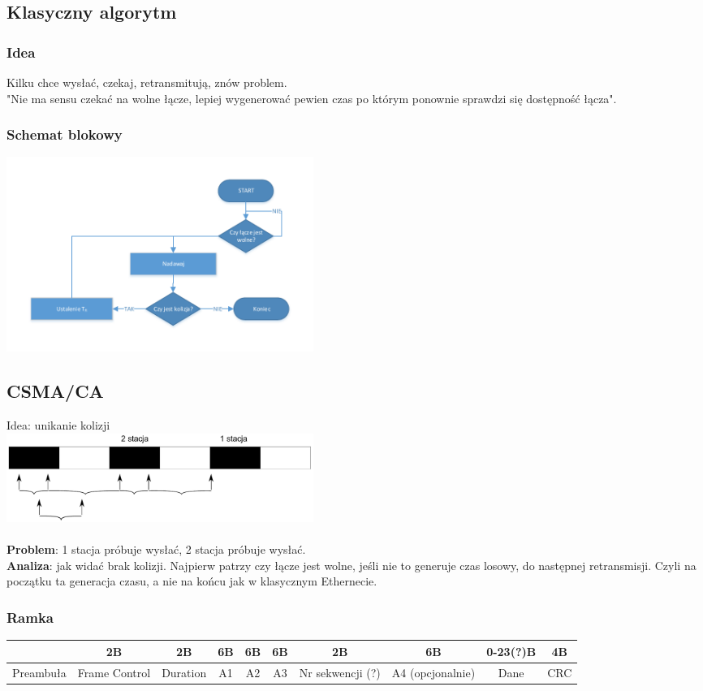 		\subsection{Klasyczny algorytm}
			\subsubsection{Idea}
				Kilku chce wysłać, czekaj, retransmitują, znów problem.\\
				"Nie ma sensu czekać na wolne łącze, lepiej wygenerować pewien czas po którym ponownie sprawdzi się dostępność łącza".
			\subsubsection{Schemat blokowy}
				\includegraphics[width=10cm]{./images/image21.pdf}
		\subsection{CSMA/CA}
			Idea: unikanie kolizji\\
			\includegraphics[width=10cm]{./images/image22.pdf}\\\\
			\textbf{Problem}: 1 stacja próbuje wysłać, 2 stacja próbuje wysłać.\\
			\textbf{Analiza}: jak widać brak kolizji. Najpierw patrzy czy łącze jest wolne, jeśli nie to generuje czas losowy, do następnej retransmisji. Czyli na początku ta generacja czasu, a nie na końcu jak w klasycznym Ethernecie.
		\subsubsection{Ramka}
			\begin{tabular}{|c|c|c|c|c|c|c|c|c|c|}
				\hline  & 2B & 2B & 6B & 6B & 6B & 2B & 6B & 0-23(?)B & 4B \\ 
				\hline Preambuła & Frame Control & Duration & A1 & A2 & A3 & Nr sekwencji (?) & A4 (opcjonalnie) & Dane & CRC \\ 
				\hline 
			\end{tabular}
